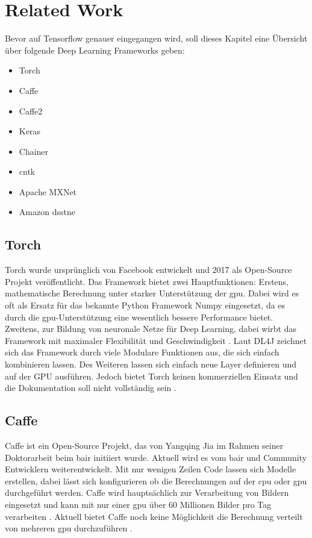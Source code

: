 \section{Related Work}
Bevor auf Tensorflow genauer eingegangen wird, soll dieses Kapitel eine Übersicht über folgende Deep Learning Frameworks geben:
\begin{multicols}{2}
	\begin{itemize}
		\item Torch
		\item Caffe
		\item Caffe2
		\item Keras
		\item Chainer
		\item \acs{cntk}
		\item Apache MXNet
		\item Amazon \acs{dsstne}
	\end{itemize}
\end{multicols}
	
\subsection{Torch}
Torch wurde ursprünglich von Facebook entwickelt und 2017 als Open-Source Projekt veröffentlicht. Das Framework bietet zwei Hauptfunktionen: Erstens, mathematische Berechnung unter starker Unterstützung der \ac{gpu}. Dabei wird es oft als Ersatz für das bekannte Python Framework Numpy eingesetzt, da es durch die \ac{gpu}-Unterstützung eine wesentlich bessere Performance bietet. Zweitens, zur Bildung von neuronale Netze für Deep Learning, dabei wirbt das Framework mit maximaler Flexibilität und Geschwindigkeit \cite{Torch}. Laut DL4J zeichnet sich das Framework durch viele Modulare Funktionen aus, die sich einfach kombinieren lassen. Des Weiteren lassen sich einfach neue Layer definieren und auf der GPU ausführen. Jedoch bietet Torch keinen kommerziellen Einsatz und die Dokumentation soll nicht vollständig sein \cite{DeepLearningFrameworks}. 

\subsection{Caffe}
Caffe ist ein Open-Source Projekt, das von Yangqing Jia im Rahmen seiner Doktorarbeit beim \ac{bair} initiiert wurde. Aktuell wird es vom \ac{bair} und Community Entwicklern weiterentwickelt. Mit nur wenigen Zeilen Code lassen sich Modelle erstellen, dabei lässt sich konfigurieren ob die Berechnungen auf der \acs{cpu} oder \ac{gpu} durchgeführt werden. Caffe wird hauptsächlich zur Verarbeitung von Bildern eingesetzt und kann mit nur einer \ac{gpu} über 60 Millionen Bilder pro Tag verarbeiten \cite{Caffe}. Aktuell bietet Caffe noch keine Möglichkeit die Berechnung verteilt von mehreren \ac{gpu} durchzuführen \cite{DeepLearningFrameworks}.

